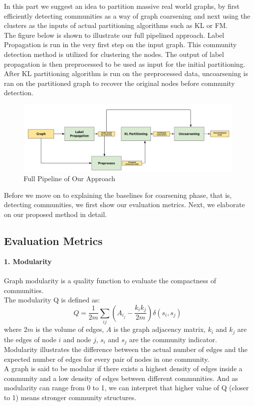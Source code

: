 In this part we suggest an idea to partition massive real world graphs, by first efficiently detecting communities as a way of graph coarsening and next using the clusters as the inputs of actual partitioning algorithms such as KL or FM. \\
The figure below is shown to illustrate our full pipelined approach. Label Propagation is run in the very first step on the input graph. This community detection method is utilized for clustering the nodes. The output of label propagation is then preprocessed to be used as input for the initial partitioning. After KL partitioning algorithm is run on the preprocessed data, uncoarsening is ran on the partitioned graph to recover the original nodes before community detection.
\begin{figure}[htb!]
    \centering
    \includegraphics[width=0.9\linewidth]{FIG/full_pipeline.png}
    \caption{Full Pipeline of Our Approach}
    \label{fig:full_pipeline}
\end{figure}

Before we move on to explaining the baselines for coarsening phase, that is, detecting communities, we first show our evaluation metrics. Next, we elaborate on our proposed method in detail.
\subsection{Evaluation Metrics}
\textbf{1. Modularity} \\ \\
Graph modularity is a quality function to evaluate the compactness of communities.\\
The modularity Q is defined as:
\[ Q = \frac{1}{2m}\sum_{ij}^{}\left(A_i_j-\frac{k_ik_j}{2m}\right)\delta\left(s_i,s_j\right)\]
where $2m$ is the volume of edges, $A$ is the graph adjacency matrix, $k_i$ and $k_j$ are the edges of node $i$ and node $j$, $s_i$ and $s_j$ are the community indicator.
Modularity illustrates the difference between the actual number of edges and the expected number of edges for every pair of nodes in one community.\\
A graph is said to be modular if there exists a highest density of edges inside a community and a low density of edges between different communities. 
And as modularity can range from 0 to 1, we can interpret that higher value of Q (closer to 1) means stronger community structures. \\

